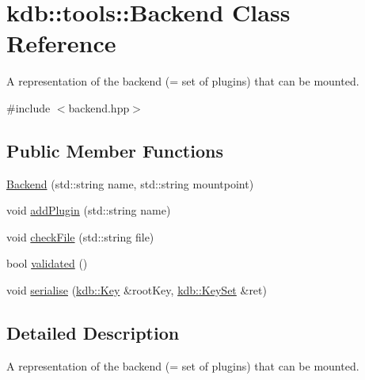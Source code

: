 \hypertarget{classkdb_1_1tools_1_1Backend}{\section{kdb\-:\-:tools\-:\-:Backend Class Reference}
\label{classkdb_1_1tools_1_1Backend}
}


A representation of the backend (= set of plugins) that can be mounted.  




{\ttfamily \#include $<$backend.\-hpp$>$}

\subsection*{Public Member Functions}
\begin{DoxyCompactItemize}
\item 
\hyperlink{classkdb_1_1tools_1_1Backend_ab0c4718a46d836867f6a94e19681cbbe}{Backend} (std\-::string name, std\-::string mountpoint)
\item 
void \hyperlink{classkdb_1_1tools_1_1Backend_ac8570864ee3fcff56316f435a2f928ee}{add\-Plugin} (std\-::string name)
\item 
void \hyperlink{classkdb_1_1tools_1_1Backend_ab714909e0ca3f871ab06f4db00d77e2f}{check\-File} (std\-::string file)
\item 
bool \hyperlink{classkdb_1_1tools_1_1Backend_a61182a9bd27aaefe0347ad5ea2db9b33}{validated} ()
\item 
void \hyperlink{classkdb_1_1tools_1_1Backend_acb6f43d0d7eaf40570c37564aa0f3c53}{serialise} (\hyperlink{classkdb_1_1Key}{kdb\-::\-Key} \&root\-Key, \hyperlink{classkdb_1_1KeySet}{kdb\-::\-Key\-Set} \&ret)
\end{DoxyCompactItemize}


\subsection{Detailed Description}
A representation of the backend (= set of plugins) that can be mounted. 


